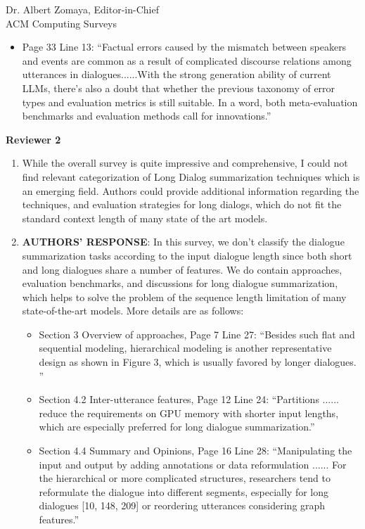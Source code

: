 \documentclass[11pt]{letter} %
\begin{document}
\begin{letter}{
Dr. Albert Zomaya, Editor-in-Chief  \\
ACM Computing Surveys}
\begin{enumerate}
\begin{itemize}
			\item Page 33 Line 13: ``Factual errors caused by the mismatch between speakers and events are common as a result of complicated discourse relations among utterances in dialogues......With the strong generation ability of current LLMs, there’s also a doubt that whether the previous taxonomy of error types and evaluation metrics is still suitable. In a word, both meta-evaluation benchmarks and evaluation methods call for innovations.''
		\end{itemize}
			
\end{enumerate}

\textbf{Reviewer 2}
\begin{enumerate}
	\item While the overall survey is quite impressive and comprehensive, I could not find relevant categorization of Long Dialog summarization techniques which is an emerging field. Authors could provide additional information regarding the techniques, and evaluation strategies for long dialogs, which do not fit the standard context length of many state of the art models.
	\item[] \textbf{AUTHORS' RESPONSE}:  In this survey, we don't classify the dialogue summarization tasks according to the input dialogue length since both short and long dialogues share a number of features. We do contain approaches, evaluation benchmarks, and discussions for long dialogue summarization, which helps to solve the problem of the sequence length limitation of many state-of-the-art models. More details are as follows:
		\begin{itemize}
			\item Section 3 Overview of approaches, Page 7 Line 27: ``Besides such flat and sequential modeling, hierarchical modeling is another representative design as shown in Figure 3, which is usually favored by longer dialogues. ''
			\item Section 4.2 Inter-utterance features, Page 12 Line 24: ``Partitions ...... reduce the requirements on GPU memory with shorter input lengths, which are especially preferred for long dialogue summarization.''
			\item Section 4.4 Summary and Opinions, Page 16 Line 28: ``Manipulating the input and output by adding annotations or data reformulation ...... For the hierarchical or more complicated structures, researchers tend to reformulate the dialogue into different segments, especially for long dialogues [10, 148, 209] or reordering utterances considering graph features.'' 

\end{itemize}
\end{enumerate}
\end{letter}
\end{document}
